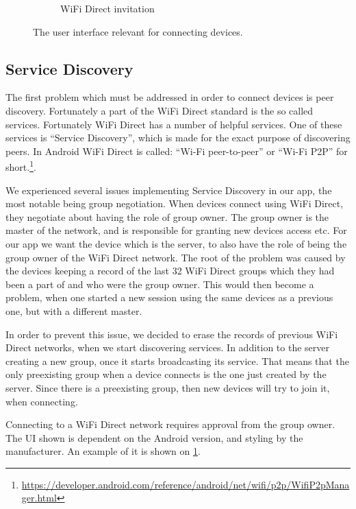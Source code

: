 \begin{figure}[ht]
\begin{subfigure}[b]{0.33\linewidth}
    \caption{WiFi Direct invitation}
    \label{fig:wifidirectinv}
    \vspace{4ex}
  \end{subfigure}
  \caption{The user interface relevant for connecting devices.}
  \label{fig:connecting}
\end{figure}

\subsection{Service Discovery}

The first problem which must be addressed in order to connect devices is peer discovery.
Fortunately a part of the WiFi Direct standard is the so called services.
Fortunately WiFi Direct has a number of helpful services.
One of these services is ``Service Discovery'', which is made for the exact purpose of discovering peers.
In Android WiFi Direct is called: ``Wi-Fi peer-to-peer'' or ``Wi-Fi P2P'' for short.\footnote{\url{https://developer.android.com/reference/android/net/wifi/p2p/WifiP2pManager.html}}.

We experienced several issues implementing Service Discovery in our app, the most notable being group negotiation.
When devices connect using WiFi Direct, they negotiate about having the role of group owner.
The group owner is the master of the network, and is responsible for granting new devices access etc.
For our app we want the device which is the server, to also have the role of being the group owner of the WiFi Direct network.
The root of the problem was caused by the devices keeping a record of the last 32 WiFi Direct groups which they had been a part of and who were the group owner.
This would then become a problem, when one started a new session using the same devices as a previous one, but with a different master.

In order to prevent this issue, we decided to erase the records of previous WiFi Direct networks, when we start discovering services.
In addition to the server creating a new group, once it starts broadcasting its service.
That means that the only preexisting group when a device connects is the one just created by the server.
Since there is a preexisting group, then new devices will try to join it, when connecting.

Connecting to a WiFi Direct network requires approval from the group owner.
The UI shown is dependent on the Android version, and styling by the manufacturer.
An example of it is shown on \cref{fig:wifidirectinv}.


